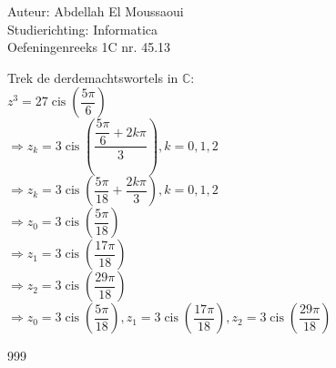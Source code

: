 \documentclass[a4paper]{article}
\begin{document}
  
\noindent \large Auteur: Abdellah El Moussaoui \\
\noindent \large Studierichting: Informatica\\
\noindent \large Oefeningenreeks 1C nr. 45.13\\

\medskip

\normalsize

\medskip

Trek de derdemachtswortels in $\mathbb{C}$:\\

$z^3=27\operatorname{cis}\left(\dfrac{5\pi}{6}\right)$\\

$\Rightarrow z_k=3\operatorname{cis}\left(\dfrac{\dfrac{5\pi}{6}+2k\pi}{3}\right),k=0,1,2$\\

$\Rightarrow z_k=3\operatorname{cis}\left(\dfrac{5\pi}{18}+\dfrac{2k\pi}{3}\right),k=0,1,2$\\

$\Rightarrow z_0=3\operatorname{cis}\left(\dfrac{5\pi}{18}\right)$\\

$\Rightarrow z_1=3\operatorname{cis}\left(\dfrac{17\pi}{18}\right)$\\

$\Rightarrow z_2=3\operatorname{cis}\left(\dfrac{29\pi}{18}\right)$\\

$\Rightarrow \boxed{z_0=3\operatorname{cis}\left(\dfrac{5\pi}{18}\right),z_1=3\operatorname{cis}\left(\dfrac{17\pi}{18}\right),z_2=3\operatorname{cis}\left(\dfrac{29\pi}{18}\right)}$\\

\begin{thebibliography}{999}
\end{thebibliography}
\end{document}
